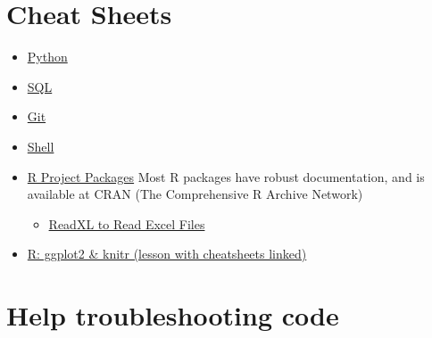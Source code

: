 \documentclass[
]{book}
\providecommand{\tightlist}{%
  \setlength{\itemsep}{0pt}\setlength{\parskip}{0pt}}
\begin{document}
\section{Cheat Sheets}\label{cheat-sheets}

\begin{itemize}
\tightlist
\item
  \href{https://docs.google.com/document/d/1EkKX0iLZORNaixrB90rX7NXTQ051qSN9K_UHS-3WdwI/}{Python}
\item
  \href{https://docs.google.com/document/d/1mnhYe88ctjAVWR_cEUmP7XlWtBMt9-VqXJeaOkKVCMI/}{SQL}
\item
  \href{https://docs.google.com/document/d/1fo08RDG0G0r33x3DGGvQ7IpUDLB3uPy2tzQpYQYTWbc/}{Git}
\item
  \href{https://docs.google.com/document/d/1GstF7VGOmyttGYuZ29PBzP-YLoJ7XGgJX0DI6zluD6g/}{Shell}
\item
  \href{https://cran.r-project.org/web/packages/}{R Project Packages} Most R packages have robust documentation, and is available at CRAN (The Comprehensive R Archive Network)

  \begin{itemize}
  \tightlist
  \item
    \href{https://cran.r-project.org/web/packages/readxl/index.html}{ReadXL to Read Excel Files}
  \end{itemize}
\item
  \href{https://hackmd.io/@kekoziar/ryGX1rrxo}{R: ggplot2 \& knitr (lesson with cheatsheets linked)}
\end{itemize}

\section{Help troubleshooting code}\label{help-troubleshooting-code}
\end{document}
